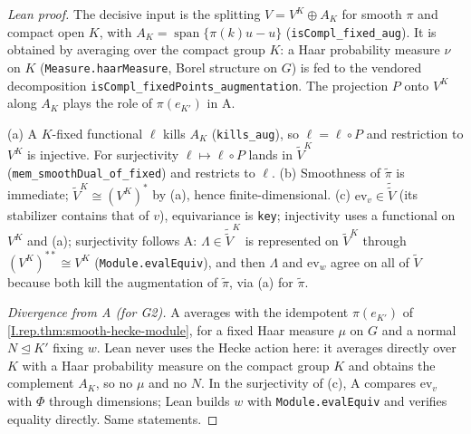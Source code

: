 \begin{proof}[Lean proof]
The decisive input is the splitting $V=V^K\oplus A_K$ for smooth $\pi$ and compact open $K$, with $A_K=\operatorname{span}\{\pi(k)u-u\}$ (\texttt{isCompl\_fixed\_aug}). It is obtained by averaging over the compact group $K$: a Haar probability measure $\nu$ on $K$ (\texttt{Measure.haarMeasure}, Borel structure on $G$) is fed to the vendored decomposition \texttt{isCompl\_fixedPoints\_augmentation}. The projection $P$ onto $V^K$ along $A_K$ plays the role of $\pi(e_{K'})$ in A.

(a) A $K$-fixed functional $\ell$ kills $A_K$ (\texttt{kills\_aug}), so $\ell=\ell\circ P$ and restriction to $V^K$ is injective. For surjectivity $\ell\mapsto\ell\circ P$ lands in $\tilde V^K$ (\texttt{mem\_smoothDual\_of\_fixed}) and restricts to $\ell$. (b) Smoothness of $\tilde\pi$ is immediate; $\tilde V^K\cong(V^K)^*$ by (a), hence finite-dimensional. (c) $\mathrm{ev}_v\in\tilde{\tilde V}$ (its stabilizer contains that of $v$), equivariance is \texttt{key}; injectivity uses a functional on $V^K$ and (a); surjectivity follows A: $\Lambda\in\tilde{\tilde V}^K$ is represented on $\tilde V^K$ through $(V^K)^{**}\cong V^K$ (\texttt{Module.evalEquiv}), and then $\Lambda$ and $\mathrm{ev}_w$ agree on all of $\tilde V$ because both kill the augmentation of $\tilde\pi$, via (a) for $\tilde\pi$.

\emph{Divergence from A (for G2).} A averages with the idempotent $\pi(e_{K'})$ of \cref{I.rep.thm:smooth-hecke-module}, for a fixed Haar measure $\mu$ on $G$ and a normal $N\trianglelefteq K'$ fixing $w$. Lean never uses the Hecke action here: it averages directly over $K$ with a Haar probability measure on the compact group $K$ and obtains the complement $A_K$, so no $\mu$ and no $N$. In the surjectivity of (c), A compares $\mathrm{ev}_v$ with $\Phi$ through dimensions; Lean builds $w$ with \texttt{Module.evalEquiv} and verifies equality directly. Same statements.
\end{proof}

